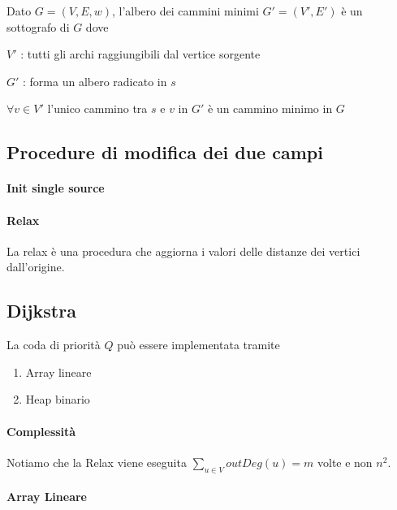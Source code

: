 {Dato $G=(V,E,w)$, l'albero dei cammini minimi $G'=(V',E')$ è un sottografo di $G$ dove}

{$V'$ : tutti gli archi raggiungibili dal vertice sorgente}

{$G'$ : forma un albero radicato in $s$}

{$\forall v \in V'$ l'unico cammino tra $s$ e $v$ in $G'$ è un cammino minimo in $G$}

\subsection{Procedure di modifica dei due campi}

\paragraph{Init single source}



\paragraph{Relax}

La relax è una procedura che aggiorna i valori  delle distanze dei vertici dall'origine.





\subsection{Dijkstra}



{La coda di priorità $Q$ può essere implementata tramite}

\begin{enumerate}
\tightlist
\item
  {Array lineare}
\item
  {Heap binario}
\end{enumerate}

\paragraph{Complessità}

Notiamo che la Relax viene eseguita $\sum_{u \in V}{outDeg(u)} = m$ volte e non $n^2$.

\paragraph{Array Lineare}

